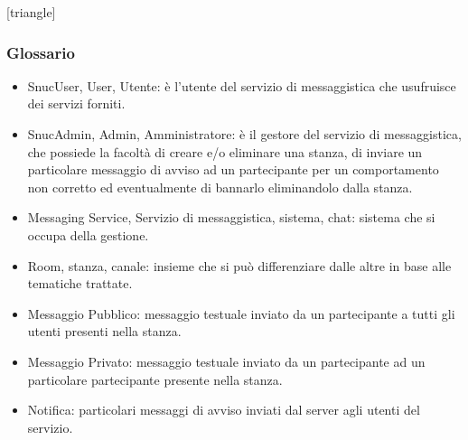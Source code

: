 \documentclass[t]{beamer} %
\let\olditem=\item%
\renewcommand{\item}{\olditem \justifying}%
\begin{document}
[triangle]
\begin{frame} [allowframebreaks]
  \frametitle{Glossario} 
   \begin{itemize} 
    \item SnucUser, User, Utente: è l'utente del servizio di messaggistica che usufruisce dei servizi forniti.
    \item SnucAdmin, Admin, Amministratore: è il gestore del servizio di messaggistica, che possiede la facoltà di creare e/o eliminare una stanza, di inviare un 
          particolare messaggio di avviso ad un partecipante per un comportamento non corretto ed eventualmente di bannarlo eliminandolo dalla stanza.
    \item Messaging Service, Servizio di messaggistica, sistema, chat: sistema che si occupa della gestione.
    \item Room, stanza, canale: insieme che si può differenziare dalle altre in base alle tematiche trattate.
    \item Messaggio Pubblico: messaggio testuale inviato da un partecipante a tutti gli utenti presenti nella stanza.
    \item Messaggio Privato: messaggio testuale inviato da un partecipante ad un particolare partecipante presente nella stanza.
    \item Notifica: particolari messaggi di avviso inviati dal server agli utenti del servizio.  
  \end{itemize}
\end{frame}
\end{document}
